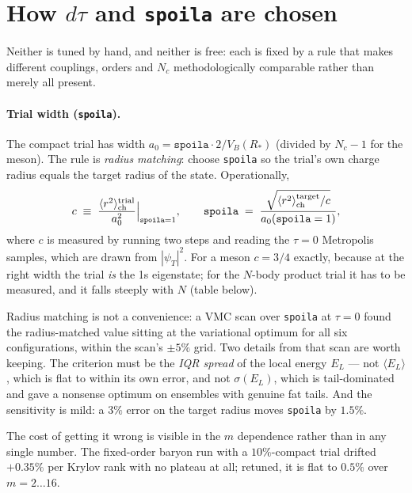 \documentclass[11pt]{article}
\newcommand{\rch}{\langle r^2\rangle_{\rm ch}}
\begin{document}
\section{How $d\tau$ and \texttt{spoila} are chosen}

Neither is tuned by hand, and neither is free: each is fixed by a rule that makes different
couplings, orders and $N_c$ methodologically comparable rather than merely all present.

\paragraph{Trial width (\texttt{spoila}).}  The compact trial has width
$a_0=\texttt{spoila}\cdot2/V_B(R_*)$ (divided by $N_c-1$ for the meson).  The rule is
\emph{radius matching}: choose \texttt{spoila} so the trial's own charge radius equals the
target radius of the state.  Operationally,
\begin{equation}
  c \;\equiv\; \frac{\rch^{\rm trial}}{a_0^2}\Big|_{\texttt{spoila}=1},
  \qquad
  \texttt{spoila} \;=\; \frac{\sqrt{\rch^{\rm target}/c}}{a_0(\texttt{spoila}=1)} ,
\end{equation}
where $c$ is measured by running two steps and reading the $\tau=0$ Metropolis samples, which
are drawn from $|\psi_T|^2$.  For a meson $c=3/4$ exactly, because at the right width the trial
\emph{is} the 1s eigenstate; for the $N$-body product trial it has to be measured, and it falls
steeply with $N$ (table below).

Radius matching is not a convenience: a VMC scan over \texttt{spoila} at $\tau=0$ found the
radius-matched value sitting at the variational optimum for all six configurations, within the
scan's $\pm5\%$ grid.  Two details from that scan are worth keeping.  The criterion must be the
\emph{IQR spread} of the local energy $E_L$ --- not $\langle E_L\rangle$, which is flat to
within its own error, and not $\sigma(E_L)$, which is tail-dominated and gave a nonsense
optimum on ensembles with genuine fat tails.  And the sensitivity is mild: a $3\%$ error on the
target radius moves \texttt{spoila} by $1.5\%$.

The cost of getting it wrong is visible in the $m$ dependence rather than in any single number.
The fixed-order baryon run with a $10\%$-compact trial drifted $+0.35\%$ per Krylov rank with
no plateau at all; retuned, it is flat to $0.5\%$ over $m=2\dots16$.
\end{document}
